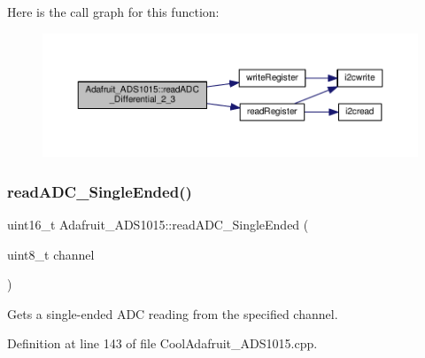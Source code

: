 Here is the call graph for this function\+:
\nopagebreak
\begin{figure}[H]
\begin{center}
\leavevmode
\includegraphics[width=350pt]{class_adafruit___a_d_s1015_a38311881bcab46f7496c4bb6e4cad576_cgraph}
\end{center}
\end{figure}
\mbox{\label{class_adafruit___a_d_s1015_a40f38b9e1f3ec397c0670dd632510235}} 
\subsubsection{\texorpdfstring{read\+A\+D\+C\+\_\+\+Single\+Ended()}{readADC\_SingleEnded()}}
{\footnotesize\ttfamily uint16\+\_\+t Adafruit\+\_\+\+A\+D\+S1015\+::read\+A\+D\+C\+\_\+\+Single\+Ended (\begin{DoxyParamCaption}\item[{uint8\+\_\+t}]{channel }\end{DoxyParamCaption})}



Gets a single-\/ended A\+DC reading from the specified channel. 



Definition at line 143 of file Cool\+Adafruit\+\_\+\+A\+D\+S1015.\+cpp.

